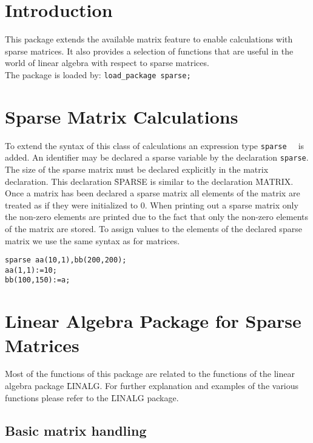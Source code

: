 \documentclass[11pt,letterpaper]{book}
\makeatletter
\newcommand{\underscore}{\_}
\newcommand{\ttindex}[1]{{\renewcommand{\_}{\protect\underscore}%
                          \index{#1@{\tt #1}}}}
\makeatother
\begin{document}
\section{Introduction}

This package extends the available matrix feature to enable
calculations with sparse matrices. It also provides
a selection of functions that are useful in the world of linear
algebra with respect to sparse matrices. \\
The package is loaded by: {\tt load\_package sparse;}


\section{Sparse Matrix Calculations}

To extend the syntax of this class of calculations an expression type
{\tt sparse \ttindex{SPARSE}} is added. An identifier may be declared a
sparse variable by the declaration {\tt sparse}. The size of the
sparse matrix must be declared explicitly in the matrix declaration.
This declaration \f{SPARSE} is similar to the declaration \f{MATRIX}.
Once a matrix has been declared a sparse matrix all elements of the
matrix are treated as if they were initialized to 0. When printing out
a sparse matrix only the non-zero elements are printed due to the fact
that only the non-zero elements of the matrix are stored. To assign values
to the elements of the declared sparse matrix we use the same syntax as for
matrices.

{\small\begin{verbatim}
sparse aa(10,1),bb(200,200);
aa(1,1):=10;
bb(100,150):=a;
\end{verbatim}}


\section{Linear Algebra Package for Sparse Matrices}

Most of the functions of this package are related to the functions
of the linear algebra package \f{LINALG}. For further explanation and
examples of the various functions please refer to the \f{LINALG}
package.

\subsection{Basic matrix handling}
\end{document}
